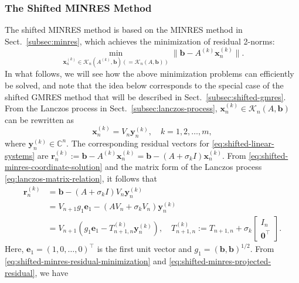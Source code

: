 \subsubsection{{The Shifted MINRES Method}}\label{subsec:shifted-minres}
{The shifted MINRES method is based on the MINRES method in Sect.\ \ref{subsec:minres}, which achieves the minimization of residual 2-norms:}
\begin{equation}\label{eq:shifted-minres-residual-minimization}\min_{\bm x_n^{(k)}\in\mathcal K_n(A^{(k)},\bm b)(=\mathcal K_n(A,\bm b))}\|\bm b-A^{(k)}\bm x_n^{(k)}\|.\end{equation}
{In what follows, we will see how the above minimization problems can efficiently be solved, and note that the idea below corresponds to the special case of the shifted GMRES method  that will be described in Sect.\ \ref{subsec:shifted-gmres}.}
{From the Lanczos process in Sect.\ \ref{subsec:lanczos-process}, $\bm x_n^{(k)}\in\mathcal K_n(A,\bm b)$ can be rewritten as}
\begin{equation}\label{eq:shifted-minres-coordinate-solution}\bm x_n^{(k)}=V_n\bm y_n^{(k)},\quad k=1,2,\ldots,m,\end{equation}
{where $\bm y_n^{(k)}\in\mathbb C^n$. The corresponding residual vectors for \eqref{eq:shifted-linear-systems} are $\bm r_n^{(k)}:=\bm b-A^{(k)}\bm x_n^{(k)}=\bm b-(A+\sigma_k I)\bm x_n^{(k)}$. From \eqref{eq:shifted-minres-coordinate-solution} and the matrix form of the Lanczos process \eqref{eq:lanczos-matrix-relation}, it follows that}
\begin{equation}\label{eq:shifted-minres-projected-residual}\begin{aligned}\bm r_n^{(k)}&=\bm b-(A+\sigma_k I)V_n\bm y_n^{(k)}\\&=V_{n+1}g_1\bm e_1-(AV_n+\sigma_kV_n)\bm y_n^{(k)}\\&=V_{n+1}(g_1\bm e_1-T_{n+1,n}^{(k)}\bm y_n^{(k)}),\quad T_{n+1,n}^{(k)}:=T_{n+1,n}+\sigma_k\begin{bmatrix}I_n\\\bm0^{\top}\end{bmatrix}.\end{aligned}\end{equation}
{Here, $\bm e_1=(1,0,\ldots,0)^{\top}$ is the first unit vector and $g_1=(\bm b,\bm b)^{1/2}$. From \eqref{eq:shifted-minres-residual-minimization} and \eqref{eq:shifted-minres-projected-residual}, we have}
